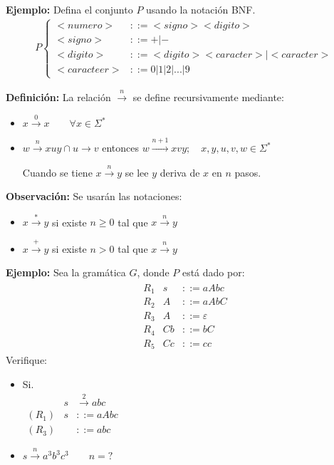 \textbf{Ejemplo: }Defina el conjunto $P$ usando la notación BNF.
\begin{align*}
P\left\{ \begin{array}{rl}
<numero>	&::=<signo><digito>	\\	
<signo>		&::=+ | -	\\
<digito>	&::=<digito><caracter>|<caracter>	\\
<caracteer>	&::=0|1|2|...|9 
\end{array}\right.
\end{align*}

\textbf{Definición: }La relación $\xrightarrow{n}$ se define recursivamente mediante:
\begin{itemize}
\item $x\xrightarrow{0}x\qquad \forall x\in\Sigma^*$
\item $w\xrightarrow{n}xuy \cap u\rightarrow v$ entonces $w\xrightarrow{n+1}xvy;	\quad x,y,u,v,w \in\Sigma^*$

Cuando se tiene $x\xrightarrow{n}y$ se lee $y$ deriva de $x$ en $n$ pasos.
\end{itemize}

\textbf{Observación: }Se usarán las notaciones:
\begin{itemize}
\item $x\xrightarrow{*}y$ si existe $n \geq 0$ tal que $x\xrightarrow{n}y$
\item $x\xrightarrow{+}y$ si existe $n>0$ tal que $x\xrightarrow{n}y$
\end{itemize}

\textbf{Ejemplo: }Sea la gramática $G$, donde $P$ está dado por:
\begin{align*}
\begin{array}{lrl}
R_1	&s	&::=aAbc \\
R_2	&A	&::=aAbC	\\
R_3	&A	&::=\varepsilon	\\
R_4	&Cb	&::=bC	\\
R_5	&Cc	&::=cc
\end{array}
\end{align*}
Verifique:
\begin{itemize}
\item Si.\\     
$
\begin{array}{lrl}
	&s	&\xrightarrow{2}abc	\\
(R_1)& s &::=aAbc	\\
(R_3)&	 &::=abc
\end{array}
$

\item $s\xrightarrow{n}a^3b^3c^3 \qquad n=?$
\end{itemize}

